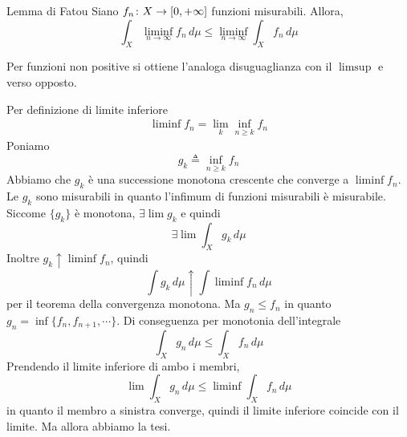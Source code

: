 \documentclass[a4paper]{article}
\begin{document}
\begin{radioactive}
\begin{snippetlemma}{Lemma di Fatou}
    Siano \(f_n \colon X \to [0,+\infty]\) funzioni misurabili. Allora,
    \[
        \int_X\liminf_{n\to\infty}f_n\,d\mu
        \leq\liminf_{n\to\infty}\int_Xf_n\,d\mu
    \]
\end{snippetlemma}
\end{radioactive}

\begin{radioactive}
Per funzioni non positive si ottiene l'analoga disuguaglianza con il \(\limsup\) e verso opposto.
\end{radioactive}

\begin{radioactive}
\begin{snippetproof}{}
    Per definizione di limite inferiore
    \begin{align*}
        \liminf f_n = \lim_k \inf_{n \geq k} f_n
    \end{align*}
    Poniamo \[
        g_k \triangleq \inf_{n \geq k} f_n
    \]
    Abbiamo che \(g_k\) è una successione monotona crescente che converge a \(\liminf f_n\).
    Le \(g_k\) sono misurabili in quanto l'infimum di funzioni misurabili è misurabile.
    Siccome \(\{g_k\}\) è monotona, \(\exists \lim g_k\) e quindi \[
        \exists \lim \int_X g_k \,d\mu
    \]
    Inoltre \(g_k \uparrow \liminf f_n\), quindi
    \[
        \int g_k\,d\mu \uparrow \int \liminf f_n\,d\mu
    \]
    per il teorema della convergenza monotona.
    Ma \(g_n \leq f_n\) in quanto \(g_n = \inf\{f_n, f_{n+1}, \cdots\}\).
    Di conseguenza per monotonia dell'integrale
    \[
        \int_X g_n\,d\mu \leq \int_X f_n\,d\mu
    \]
    Prendendo il limite inferiore di ambo i membri,
    \[
        \lim \int_X g_n \,d\mu \leq \liminf \int_X f_n\,d\mu
    \]
    in quanto il membro a sinistra converge, quindi il limite inferiore coincide con il limite.
    Ma allora abbiamo la tesi.
\end{snippetproof}
\end{radioactive}
\end{document}
